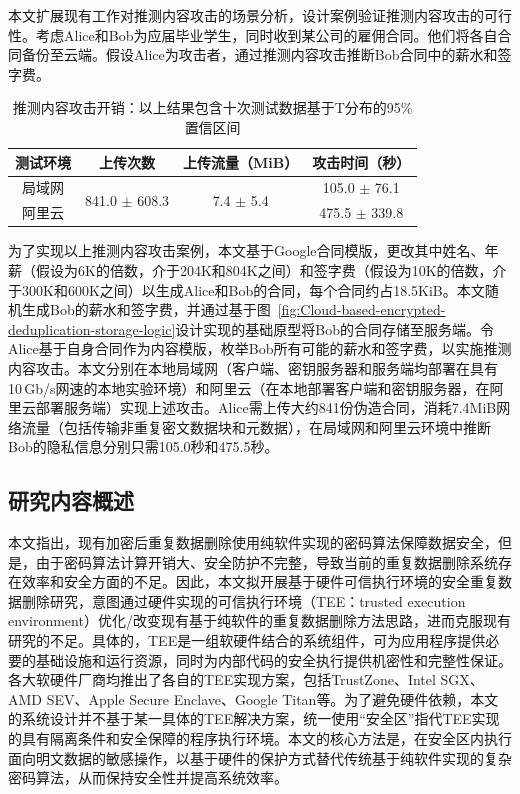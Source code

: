 本文扩展现有工作\cite{harnik10,zuo2018mitigating}对推测内容攻击的场景分析，设计案例验证推测内容攻击的可行性。考虑Alice和Bob为应届毕业学生，同时收到某公司的雇佣合同。他们将各自合同备份至云端。假设Alice为攻击者，通过推测内容攻击推断Bob合同中的薪水和签字费。

\begin{table}[!htb]
    \small
    \centering
    \begin{tabular}{@{}cccc@{}}
    \toprule
    测试环境 & 上传次数                            & 上传流量（MiB）                       & 攻击时间（秒）        \\ \midrule
    局域网  & \multirow{2}{*}{841.0 $\pm$ 608.3} & \multirow{2}{*}{7.4 $\pm$ 5.4} & 105.0 $\pm$ 76.1 \\
    阿里云  &                                 &                                 & 475.5 $\pm$ 339.8 \\
    \bottomrule
    \end{tabular}
    \caption{推测内容攻击开销：以上结果包含十次测试数据基于T分布的95\%置信区间}
    \label{tab:intro-LRI-verify}
\end{table}

为了实现以上推测内容攻击案例，本文基于Google合同模版\cite{GoogleOffer}，更改其中姓名、年薪（假设为6K的倍数\cite{harnik10}，介于204K和804K之间）和签字费（假设为10K的倍数，介于300K和600K之间）以生成Alice和Bob的合同，每个合同约占18.5KiB。本文随机生成Bob的薪水和签字费，并通过基于图~\ref{fig:Cloud-based-encrypted-deduplication-storage-logic}设计实现的基础原型将Bob的合同存储至服务端。令Alice基于自身合同作为内容模版，枚举Bob所有可能的薪水和签字费，以实施推测内容攻击。本文分别在本地局域网（客户端、密钥服务器和服务端均部署在具有10\,Gb/s网速的本地实验环境）和阿里云（在本地部署客户端和密钥服务器，在阿里云部署服务端）实现上述攻击。Alice需上传大约841份伪造合同，消耗7.4MiB网络流量（包括传输非重复密文数据块和元数据），在局域网和阿里云环境中推断Bob的隐私信息分别只需105.0秒和475.5秒。

\subsection{研究内容概述}
\label{subsec:intro-content}

本文指出，现有加密后重复数据删除使用纯软件实现的密码算法保障数据安全，但是，由于密码算法计算开销大、安全防护不完整，导致当前的重复数据删除系统存在效率和安全方面的不足。因此，本文拟开展基于硬件可信执行环境的安全重复数据删除研究，意图通过硬件实现的可信执行环境（TEE：trusted execution environment）优化/改变现有基于纯软件的重复数据删除方法思路，进而克服现有研究的不足。具体的，TEE是一组软硬件结合的系统组件，可为应用程序提供必要的基础设施和运行资源，同时为内部代码的安全执行提供机密性和完整性保证\cite{OMTP}。各大软硬件厂商均推出了各自的TEE实现方案，包括TrustZone\cite{trustzone}、Intel SGX\cite{sgx,sgx2}、AMD SEV\cite{AMDSEV}、Apple Secure Enclave\cite{AppleSecureEnclave}、Google Titan\cite{GoogleTitan}等。为了避免硬件依赖，本文的系统设计并不基于某一具体的TEE解决方案，统一使用“安全区”指代TEE实现的具有隔离条件和安全保障的程序执行环境。本文的核心方法是，在安全区内执行面向明文数据的敏感操作，以基于硬件的保护方式替代传统基于纯软件实现的复杂密码算法，从而保持安全性并提高系统效率。

